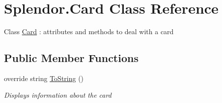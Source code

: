 \hypertarget{class_splendor_1_1_card}{}\section{Splendor.\+Card Class Reference}
\label{class_splendor_1_1_card}


Class \hyperlink{class_splendor_1_1_card}{Card} \+: attributes and methods to deal with a card  


\subsection*{Public Member Functions}
\begin{DoxyCompactItemize}
\item 
override string \hyperlink{class_splendor_1_1_card_a3403c28ee02b119ee5aae5bd10eee468}{To\+String} ()
\begin{DoxyCompactList}\small\item\em Displays information about the card \end{DoxyCompactList}\end{DoxyCompactItemize}

